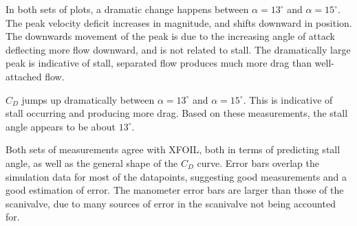 \documentclass[runningheads]{llncs}
\begin{document}
In both sets of plots, a dramatic change happens between $\alpha = 13^\circ$ and $\alpha = 15 ^\circ$. The peak velocity deficit increases in magnitude, and shifts downward in position. The downwards movement of the peak is due to the increasing angle of attack deflecting more flow downward, and is not related to stall. The dramatically large peak is indicative of stall, separated flow produces much more drag than well-attached flow.

$C_D$ jumps up dramatically between $\alpha = 13^\circ$ and $\alpha = 15 ^\circ$. This is indicative of stall occurring and producing more drag. Based on these measurements, the stall angle appears to be about $13^\circ$.

Both sets of measurements agree with XFOIL, both in terms of predicting stall angle, as well as the general shape of the $C_D$ curve. Error bars overlap the simulation data for most of the datapoints, suggesting good measurements and a good estimation of error. The manometer error bars are larger than those of the scanivalve, due to many sources of error in the scanivalve not being accounted for.
\end{document}
